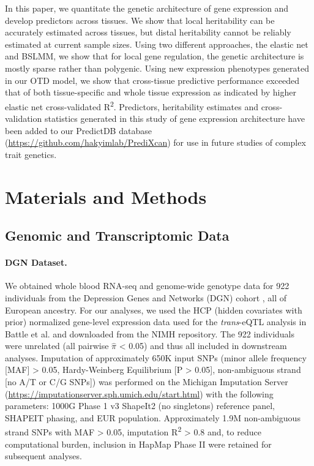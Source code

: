 \documentclass[10pt,letterpaper]{article}
\begin{document}
In this paper, we quantitate the genetic architecture of gene expression and develop predictors across tissues. We show that local heritability can be accurately estimated across tissues, but distal heritability cannot be reliably estimated at current sample sizes. Using two different approaches, the elastic net and BSLMM, we show that for local gene regulation, the genetic architecture is mostly sparse rather than polygenic. Using new expression phenotypes generated in our OTD model, we show that cross-tissue predictive performance exceeded that of both tissue-specific and whole tissue expression as indicated by higher elastic net cross-validated R\textsuperscript{2}. Predictors, heritability estimates and cross-validation statistics generated in this study of gene expression architecture have been added to our PredictDB database (\url{https://github.com/hakyimlab/PrediXcan}) for use in future studies of complex trait genetics.


\section*{Materials and Methods}
\subsection*{Genomic and Transcriptomic
Data}\label{genomic-and-transcriptomic-data}

\paragraph*{DGN Dataset.}\label{dgn-dataset}

We obtained whole blood RNA-seq and genome-wide genotype data for 922
individuals from the Depression Genes and Networks (DGN) cohort
\cite{Battle_2013}, all of European ancestry. For our analyses, we used the HCP
(hidden covariates with prior) normalized gene-level expression data
used for the \emph{trans}-eQTL analysis in Battle et al. \cite{Battle_2013} and
downloaded from the NIMH repository. The 922 individuals were unrelated
(all pairwise \(\hat{\pi}\) \textless{} 0.05) and thus all included in
downstream analyses. Imputation of approximately 650K input SNPs (minor
allele frequency {[}MAF{]} \textgreater{} 0.05, Hardy-Weinberg
Equilibrium {[}P \textgreater{} 0.05{]}, non-ambiguous strand {[}no A/T
or C/G SNPs{]}) was performed on the Michigan
Imputation Server
(\url{https://imputationserver.sph.umich.edu/start.html}) \cite{Howie_2012,Fuchsberger_2014}
with the following parameters: 1000G Phase 1 v3 ShapeIt2 (no singletons)
reference panel, SHAPEIT phasing, and EUR population. Approximately 1.9M
non-ambiguous strand SNPs with MAF \textgreater{} 0.05, imputation
R\textsuperscript{2} \textgreater{} 0.8 and, to reduce computational
burden, inclusion in HapMap Phase II were retained for subsequent
analyses.
\end{document}
